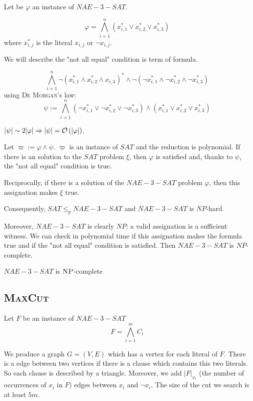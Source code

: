 Let be $\varphi$ an instance of $NAE-3-SAT$.

$$
    \varphi = \bigwedge\limits_{i=1}^n \left(x_{i,1}^* \vee x_{i,2}^* \vee x_{i,3}^*\right)
$$
where $x_{i,j}^*$ is the literal $x_{i,j}$ or $\neg x_{i,j}$.

We will describe the "not all equal" condition is term of formula.

$$
    \bigwedge\limits_{i=1}^n \neg(x_{i,1}^* \wedge x_{i,2}^* \wedge x_{i,3})^* \wedge \neg(\neg x_{i,1}^* \wedge \neg x_{i,2}^* \wedge \neg x_{i,3}^*)
$$
using \textsc{De Morgan}'s law:
$$
    \psi:=\bigwedge\limits_{i=1}^n (\neg x_{i,1}^* \vee \neg x_{i,2}^* \vee \neg x_{i,3}^*) \wedge (x_{i,1}^* \vee x_{i,2}^* \vee x_{i,3}^*)
$$

$\vert \psi\vert \sim 2\vert \varphi \vert \Rightarrow \vert \psi \vert = \mathcal O \left( \vert\varphi\vert \right)$. 

Let $\varpi := \varphi \wedge \psi$. $\varpi$ is an instance of $SAT$ and the reduction is polynomial. If there is an solution to the $SAT$ problem $\xi$, then $\varphi$ is satisfied and, thanks to $\psi$, the "not all equal" condition is true.

Reciprocally, if there is a solution of the $NAE-3-SAT$ problem $\varphi$, then this assignation makes $\xi$ true.

Consequently, $SAT \leqslant_p NAE-3-SAT$ and $NAE-3-SAT$ is $NP$-hard. 

Moreover, $NAE-3-SAT$ is clearly $NP$: a valid assignation is a sufficient witness. We can check in polynomial time if this assignation makes the formula true and if the "not all equal" condition is satisfied. Then $NAE-3-SAT$ is $NP$-complete.

\begin{theorem}
    $NAE-3-SAT$ is $\textsc{NP}$-complete
\end{theorem}
   

\subsection{\textsc{MaxCut}}

Let $F$ be an instance of $NAE-3-SAT$
$$
    F=\bigwedge\limits_{i=1}^m C_i
$$

We produce a graph $G=(V,E)$ which has a vertex for each literal of $F$. There is a edge between two vertices if there is a clause which contains this two literals. So each clause is described by a triangle. Moreover, we add $\vert F\vert_{x_i}$ (the number of occurrences of $x_i$ in $F$) edges between $x_i$ and $\neg x_i$. The size of the cut we search is at least $5m$.

